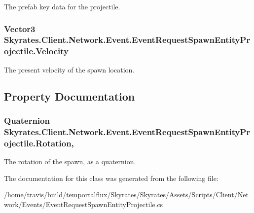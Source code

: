 The prefab key data for the projectile. 

\hypertarget{class_skyrates_1_1_client_1_1_network_1_1_event_1_1_event_request_spawn_entity_projectile_a418b03ceaf88177214e4f49f9add2fd6}{
\subsubsection[{Velocity}]{\setlength{\rightskip}{0pt plus 5cm}Vector3 Skyrates.\-Client.\-Network.\-Event.\-Event\-Request\-Spawn\-Entity\-Projectile.\-Velocity}}\label{class_skyrates_1_1_client_1_1_network_1_1_event_1_1_event_request_spawn_entity_projectile_a418b03ceaf88177214e4f49f9add2fd6}


The present velocity of the spawn location. 



\subsection{Property Documentation}
\hypertarget{class_skyrates_1_1_client_1_1_network_1_1_event_1_1_event_request_spawn_entity_projectile_a3790f220495dc59e2d11e3c1ff7c57b5}{
\subsubsection[{Rotation}]{\setlength{\rightskip}{0pt plus 5cm}Quaternion Skyrates.\-Client.\-Network.\-Event.\-Event\-Request\-Spawn\-Entity\-Projectile.\-Rotation\hspace{0.3cm}{\ttfamily [get]}, {\ttfamily [set]}}}\label{class_skyrates_1_1_client_1_1_network_1_1_event_1_1_event_request_spawn_entity_projectile_a3790f220495dc59e2d11e3c1ff7c57b5}


The rotation of the spawn, as a quaternion. 



The documentation for this class was generated from the following file\-:\begin{DoxyCompactItemize}
\item 
/home/travis/build/temportalflux/\-Skyrates/\-Skyrates/\-Assets/\-Scripts/\-Client/\-Network/\-Events/Event\-Request\-Spawn\-Entity\-Projectile.\-cs\end{DoxyCompactItemize}

